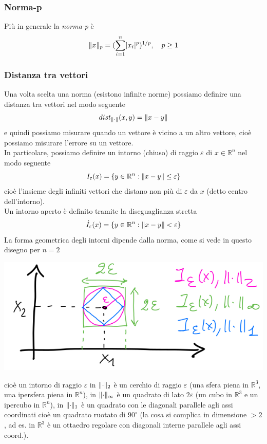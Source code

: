 \documentclass[12pt,a4paper]{article}
\DeclarePairedDelimiter{\abs}{\lvert}{\rvert}
\DeclarePairedDelimiter{\norma}{\lVert}{\rVert}
\begin{document}
\subsubsection{Norma-p}
Più in generale la \textit{norma-p} è
\[
\norma{x}_p = (\sum_{i=1}^n \abs{x_i}^p)^{1/p}, \quad p \ge 1
\]

\subsubsection{Distanza tra vettori}
Una volta scelta una norma (esistono infinite norme) possiamo definire una distanza tra vettori nel modo seguente
\[
dist_{\norma{\cdot}} (x,y) = \norma{x-y}
\]
e quindi possiamo misurare quando un vettore è vicino a un altro vettore, cioè possiamo misurare l'errore su un vettore.\\
In particolare, possiamo definire un intorno (chiuso) di raggio $\varepsilon$ di $x \in \mathbb{R}^n$ nel modo seguente
\begin{equation*}
    I_\varepsilon(x)=\left\{ y \in \mathbb{R}^n : \norma{x-y} \leq \varepsilon \right\}
\end{equation*}
cioè l'insieme degli infiniti vettori che distano non più di $\varepsilon$ da $x$ (detto centro dell'intorno). \\
Un intorno aperto è definito tramite la diseguaglianza stretta 
\begin{equation*}
    \Dot{I}_\varepsilon (x) = \left\{ y \in \mathbb{R}^n : \norma{x-y}<\varepsilon \right\}
\end{equation*}
La forma geometrica degli intorni dipende dalla norma, come si vede in questo disegno per $n=2$
\begin{center}
    \includegraphics[scale=0.5]{pag14.png}    
\end{center}
cioè un intorno di raggio $\varepsilon$ in $\norma{\cdot}_2$ è un cerchio di raggio $\varepsilon$ (una sfera piena in $\mathbb{R}^3$, una ipersfera piena in $\mathbb{R}^n$), in $\norma{\cdot}_\infty$ è un quadrato di lato $2\varepsilon$ (un cubo in $\mathbb{R}^3$ e un ipercubo in $\mathbb{R}^n$), in $\norma{\cdot}_1$ è un quadrato con le diagonali parallele agli assi coordinati cioè un quadrato ruotato di $90^\circ$ (la cosa si complica in dimensione $>2$, ad es. in $\mathbb{R}^3$ è un ottaedro regolare con diagonali interne parallele agli assi coord.). \\
\end{document}
